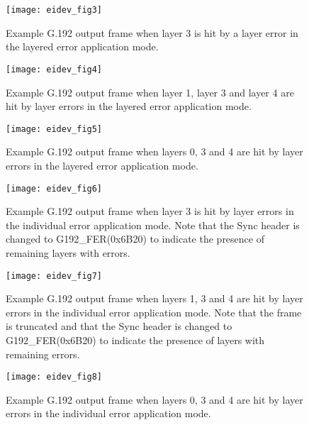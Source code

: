 \begin{figure}[htp]
  \begin{center}
	\texttt{[image: eidev\_fig3]}
	\caption{Example G.192 output frame when layer 3 is hit by a layer error 
in the layered error application mode.}
	\label{fig:G192outputFrameLayer3Error}
  \end{center}
\end{figure}

\begin{figure}[htp]
  \begin{center}
	\texttt{[image: eidev\_fig4]}
	\caption{Example G.192 output frame when layer 1, layer 3 and layer 4 
are hit by layer errors in the layered error application mode.}
	\label{fig:G192outputFrameLayer134Error}
  \end{center}
\end{figure}

\begin{figure}[htp]
  \begin{center}
	\texttt{[image: eidev\_fig5]}
	\caption{Example G.192 output frame when layers 0, 3 and 4 
are hit by layer errors in the layered error application mode.}
	\label{fig:G192outputFrameLayer034Error}
  \end{center}
\end{figure}

\begin{figure}[htp]
  \begin{center}
	\texttt{[image: eidev\_fig6]}
	\caption{Example G.192 output frame when layer 3 is hit by layer 
errors in the individual error application mode. Note that the Sync 
header is changed to G192\_FER(0x6B20) to indicate the presence of 
remaining layers with errors.}
	\label{fig:G192outputFrameLayer3ErrorIndividual}
  \end{center}
\end{figure}

\begin{figure}[htp]
  \begin{center}
	\texttt{[image: eidev\_fig7]}
	\caption{Example G.192 output frame when layers 1, 3 and 4 are hit 
by layer errors in the individual error application mode. Note that 
the frame is truncated and that the Sync header is changed to 
G192\_FER(0x6B20) to indicate the presence of layers with remaining 
errors.}
	\label{fig:G192outputFrameLayer134ErrorIndividual}
  \end{center}
\end{figure}

\begin{figure}[htp]
  \begin{center}
	\texttt{[image: eidev\_fig8]}
	\caption{Example G.192 output frame when layers 0, 3 and 4 
are hit by layer errors in the individual error application mode.}
	\label{fig:G192outputFrameLayer034ErrorIndividual}
  \end{center}
\end{figure}
